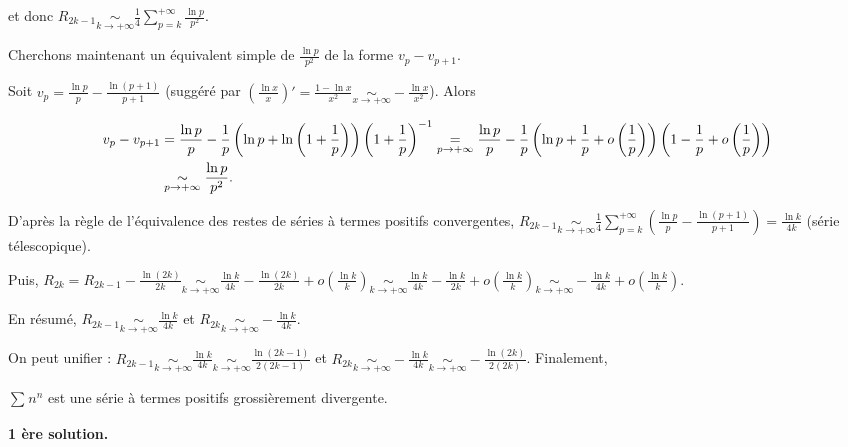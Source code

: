{{et donc $R_{2k-1}\underset{k\rightarrow+\infty}{\sim}\frac{1}{4}\sum_{p=k}^{+\infty}\frac{\ln p}{p^2}$.

Cherchons maintenant un équivalent simple de $\frac{\ln p}{p^2}$  de la forme $v_p - v_{p+1}$. 

Soit $v_p=\frac{\ln p}{p}-\frac{\ln(p+1)}{p+1}$ (suggéré par $\left(\frac{\ln x}{x}\right)'=\frac{1-\ln x}{x^2}\underset{x\rightarrow+\infty}{\sim}-\frac{\ln x}{x^2}$). Alors 

\begin{align*}\ensuremath
v_p- v_{p+1}&=\frac{\ln p}{p}-\frac{1}{p}\left(\ln p+\ln\left(1+\frac{1}{p}\right)\right)\left(1+\frac{1}{p}\right)^{-1}\underset{p\rightarrow+\infty}{=}\frac{\ln p}{p}-\frac{1}{p}\left(\ln p+\frac{1}{p}+o\left(\frac{1}{p}\right)\right)\left(1-\frac{1}{p}+o\left(\frac{1}{p}\right)\right)\\
 &\underset{p\rightarrow+\infty}{\sim}\frac{\ln p}{p^2}.
\end{align*}

D'après la règle de l'équivalence des restes de séries à termes positifs convergentes, $R_{2k-1}\underset{k\rightarrow+\infty}{\sim}\frac{1}{4}\sum_{p=k}^{+\infty}\left(\frac{\ln p}{p}-\frac{\ln(p+1)}{p+1}\right)=\frac{\ln k}{4k}$ (série télescopique). 

Puis, $R_{2k}=R_{2k-1}-\frac{\ln(2k)}{2k}\underset{k\rightarrow+\infty}{\sim}\frac{\ln k}{4k}-\frac{\ln(2k)}{2k}+o\left(\frac{\ln k}{k}\right)\underset{k\rightarrow+\infty}{\sim}\frac{\ln k}{4k}-\frac{\ln k}{2k}+o\left(\frac{\ln k}{k}\right)\underset{k\rightarrow+\infty}{\sim}-\frac{\ln k}{4k}+o\left(\frac{\ln k}{k}\right)$.

En résumé, $R_{2k-1}\underset{k\rightarrow+\infty}{\sim}\frac{\ln k}{4k}$ et $R_{2k}\underset{k\rightarrow+\infty}{\sim}-\frac{\ln k}{4k}$.

On peut unifier : $R_{2k-1}\underset{k\rightarrow+\infty}{\sim}\frac{\ln k}{4k}\underset{k\rightarrow+\infty}{\sim}\frac{\ln(2k-1)}{2(2k-1)}$   et $R_{2k}\underset{k\rightarrow+\infty}{\sim}-\frac{\ln k}{4k}\underset{k\rightarrow+\infty}{\sim}-\frac{\ln(2k)}{2(2k)}$. Finalement,

\begin{center}
\end{center}
$\sum_{}^{}n^n$ est une série à termes positifs grossièrement divergente.

\textbf{1 ère solution.}

}}
